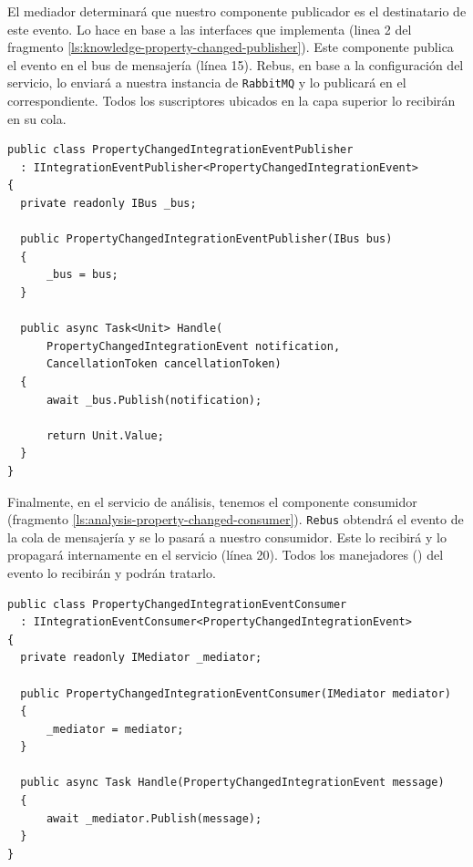 El mediador determinará que nuestro componente publicador es el destinatario de este evento. Lo hace en base a las interfaces que implementa (linea 2 del fragmento \ref{ls:knowledge-property-changed-publisher}). Este componente publica el evento en el bus de mensajería (línea 15). Rebus, en base a la configuración del servicio, lo enviará a nuestra instancia de \texttt{RabbitMQ} y lo publicará en el  correspondiente. Todos los suscriptores ubicados en la capa superior lo recibirán en su cola.

\begin{lstlisting}[language={[Sharp]C},caption={El publicador de eventos captura el evento de integración y lo publica en el bus.},captionpos=b, label=ls:knowledge-property-changed-publisher]
public class PropertyChangedIntegrationEventPublisher
  : IIntegrationEventPublisher<PropertyChangedIntegrationEvent>
{
  private readonly IBus _bus;

  public PropertyChangedIntegrationEventPublisher(IBus bus)
  {
      _bus = bus;
  }

  public async Task<Unit> Handle(
      PropertyChangedIntegrationEvent notification,
      CancellationToken cancellationToken)
  {
      await _bus.Publish(notification);

      return Unit.Value;
  }
}
\end{lstlisting}

Finalmente, en el servicio de análisis, tenemos el componente consumidor (fragmento \ref{ls:analysis-property-changed-consumer}). \texttt{Rebus} obtendrá el evento de la cola de mensajería y se lo pasará a nuestro consumidor. Este lo recibirá y lo propagará internamente en el servicio (línea 20). Todos los manejadores () del evento lo recibirán y podrán tratarlo.

\begin{lstlisting}[language={[Sharp]C},caption={El consumidor recibe el evento de integración del bus y lo propaga internamente. Todos los manejadores de este evento lo recibirán.},captionpos=b, label=ls:analysis-property-changed-consumer]
public class PropertyChangedIntegrationEventConsumer
  : IIntegrationEventConsumer<PropertyChangedIntegrationEvent>
{
  private readonly IMediator _mediator;

  public PropertyChangedIntegrationEventConsumer(IMediator mediator)
  {
      _mediator = mediator;
  }

  public async Task Handle(PropertyChangedIntegrationEvent message)
  {
      await _mediator.Publish(message);
  }
}
\end{lstlisting}

